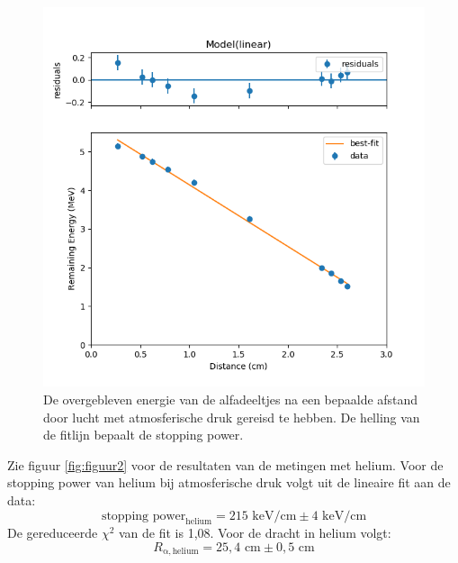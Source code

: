 \documentclass[11pt,a4paper]{article}
\begin{document}
\begin{figure}  %
\centering
\includegraphics[scale=0.7]{grafiek_lucht}
\caption{De overgebleven energie van de alfadeeltjes na een bepaalde afstand door lucht met atmosferische druk gereisd te hebben. De helling van de fitlijn bepaalt de stopping power.}
\label{fig:figuur1}
\end{figure}

\newpage

Zie figuur \ref{fig:figuur2} voor de resultaten van de metingen met helium.
Voor de stopping power van helium bij atmosferische druk volgt uit de lineaire fit aan de data:
\begin{equation}
\text{stopping power}_\mathrm{helium} = 215 \text{ keV/cm} \pm 4 \text{ keV/cm}
\label{eq:stopping_power_lucht}
\end{equation}
De gereduceerde $\chi^2$ van de fit is 1,08. Voor de dracht in helium volgt:
\begin{equation}
R_\mathrm{\alpha, helium} = 25,4 \text{ cm} \pm 0,5 \text{ cm}
\label{eq:range_air}
\end{equation}
\end{document}
